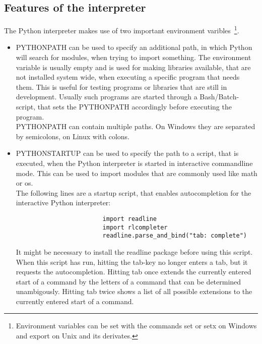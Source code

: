 		\subsection{Features of the interpreter}
			The Python interpreter makes use of two important environment varibles~\footnote{Environment variables can be set with the commands {\normalfont \ttfamily set} or {\normalfont \ttfamily setx} on Windows and {\normalfont \ttfamily export} on Unix and its derivates.}.
			\begin{itemize}
				\item {\normalfont \ttfamily PYTHONPATH} can be used to specify an additional path, in which Python will search for modules, when trying to import something.
				      The environment variable is usually empty and is used for making libraries available, that are not installed system wide, when executing a specific program that needs them.
				      This is useful for testing programs or libraries that are still in development.
				      Usually such programs are started through a Bash/Batch-script, that sets the {\normalfont \ttfamily PYTHONPATH} accordingly before executing the program.\\
				      {\normalfont \ttfamily PYTHONPATH} can contain multiple paths.
				      On Windows they are separated by semicolons, on Linux with colons.
				\item {\normalfont \ttfamily PYTHONSTARTUP} can be used to specify the path to a script, that is executed, when the Python interpreter is started in interactive commandline mode.
				      This can be used to import modules that are commonly used like {\normalfont \ttfamily math} or {\normalfont \ttfamily os}.\\
				      The following lines are a startup script, that enables autocompletion for the interactive Python interpreter:
				      \begin{verbatim}
				      	import readline
				      	import rlcompleter
				      	readline.parse_and_bind("tab: complete")
				      \end{verbatim}
				      It might be necessary to install the readline package before using this script.
				      When this script has run, hitting the tab-key no longer enters a tab, but it requests the autocompletion.
				      Hitting tab once extends the currently entered start of a command by the letters of a command that can be determined unambigously.
				      Hitting tab twice shows a list of all possible extensions to the currently entered start of a command.
			\end{itemize}

